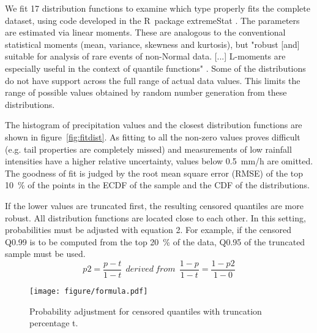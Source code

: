 \documentclass[a4paper]{article}
\begin{document}
\begin{multicols}{2}
We fit 17 distribution functions to examine which type properly fits the complete dataset, using code developed in the R~package extremeStat \citep{boessenkool_extremestat_2015}.
The parameters are estimated via linear moments. 
These are analogous to the conventional statistical moments (mean, variance, skewness and kurtosis), but "robust [and] suitable for analysis of rare events of non-Normal data. 
[...]
L-moments are especially useful in the context of quantile functions" \citep{asquith_lmomco:_2015}.
Some of the distributions do not have support across the full range of actual data values. 
This limits the range of possible values obtained by random number generation from these distributions.

The histogram of precipitation values and the closest distribution functions are shown in figure~\ref{fig:fitdist}.
As fitting to all the non-zero values proves difficult (e.g. tail properties are completely missed) and measurements of low rainfall intensities have a higher relative uncertainty, values below 0.5~mm/h are omitted. 
The goodness of fit is judged by the root mean square error (RMSE) of the top 10~\% of the points in the ECDF of the sample \citep{r_core_team_r:_2015} and the CDF of the distributions.

If the lower values are truncated first, the resulting censored quantiles are more robust.
All distribution functions are located close to each other.
In this setting, probabilities must be adjusted with equation 2.
For example, if the censored Q0.99 is to be computed from the top 20~\% of the data, Q0.95 of the truncated sample must be used.
\begin{equation}
p2  =  \frac{p-t}{1-t}~~derived~from~~\frac{1-p}{1-t}  =  \frac{1-p2}{1-0} 
\end{equation}

\begin{figure}[H] %
\texttt{[image: figure/formula.pdf]}
\caption[Probability adjustment]{Probability adjustment for censored quantiles with truncation percentage t.}
\label{fig:propadj}
\end{figure}



\end{multicols}
\end{document}
